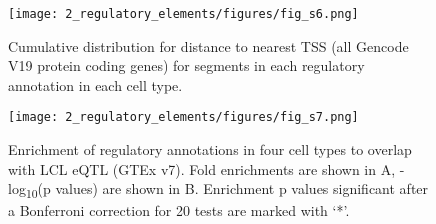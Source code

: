 \begin{figure}
    \centering
    \texttt{[image: 2\_regulatory\_elements/figures/fig\_s6.png]}
    \caption{Cumulative distribution for distance to nearest TSS (all Gencode V19 protein coding genes) for segments in each regulatory annotation in each cell type.}
    \label{fig:c1_fs6}
\end{figure}

\begin{figure}
    \centering
    \texttt{[image: 2\_regulatory\_elements/figures/fig\_s7.png]}
    \caption{Enrichment of regulatory annotations in four cell types to overlap with LCL eQTL (GTEx v7). Fold enrichments are shown in A, -log\textsubscript{10}(p values) are shown in B. Enrichment p values significant after a Bonferroni correction for 20 tests are marked with ‘*’.}
    \label{fig:c1_fs7}
\end{figure}

